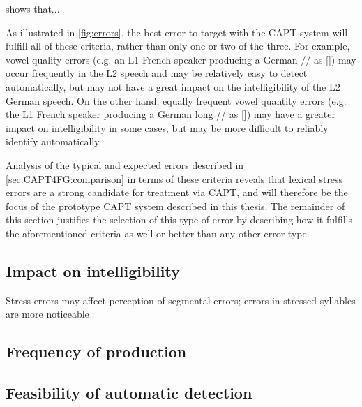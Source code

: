 	 shows that...
	
	 As illustrated in \cref{fig:errors}, the best error to target with the CAPT system will fulfill all of these criteria, rather than only one or two of the three. 
	 For example, vowel quality errors (e.g. an L1 French speaker producing a German // as [\textipa{\oe}]) may occur frequently in the L2 speech and may be relatively easy to detect automatically, but may not have a great impact on the intelligibility of the L2 German speech. On the other hand, equally frequent vowel quantity errors (e.g. the L1 French speaker producing a German long // as []) may have a greater impact on intelligibility in some cases, but may be more difficult to reliably identify automatically.
	
	Analysis of the typical and expected errors described in \cref{sec:CAPT4FG:comparison} in terms of these criteria reveals that lexical stress errors are a strong candidate for treatment via CAPT, and will therefore be the focus of the prototype CAPT system described in this thesis. The remainder of this section justifies the selection of this type of error by describing how it fulfills the aforementioned criteria as well or better than any other error type.
	


		\subsection{Impact on intelligibility}
		\citep{Warren2009}
		
		\citep{Magen1998}
		
		Stress errors may affect perception of segmental errors; errors in stressed syllables are more noticeable \citep{Cutler2005}
				
		
		\subsection{Frequency of production}
		\citep{Cutler2005}
		
		\citep{Peperkamp2002, Dupoux2001, Dupoux2008}
		
		\subsection{Feasibility of automatic detection}
		\citep{ISADEPT, delmonte2011}
		
		\citep{Bonneau2011}
		
